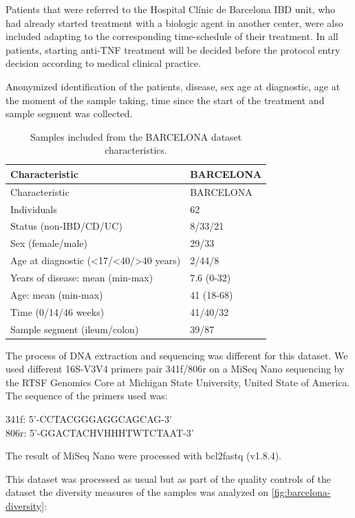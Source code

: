 \documentclass[
  a4paper,
]{book}
\begin{document}
Patients that were referred to the Hospital Clínic de Barcelona IBD unit, who had already started treatment with a biologic agent in another center, were also included adapting to the corresponding time-schedule of their treatment.
In all patients, starting anti-TNF treatment will be decided before the protocol entry decision according to medical clinical practice.

Anonymized identification of the patients, disease, sex age at diagnostic, age at the moment of the sample taking, time since the start of the treatment and sample segment was collected.

\begin{longtable}[]{@{}ll@{}}
\caption{\label{tab:BARCELONA} Samples included from the BARCELONA dataset characteristics.}\tabularnewline
\toprule
Characteristic & BARCELONA \\
\midrule
\endfirsthead
\toprule
Characteristic & BARCELONA \\
\midrule
\endhead
Individuals & 62 \\
Status (non-IBD/CD/UC) & 8/33/21 \\
Sex (female/male) & 29/33 \\
Age at diagnostic (\textless17/\textless40/\textgreater40 years) & 2/44/8 \\
Years of disease: mean (min-max) & 7.6 (0-32) \\
Age: mean (min-max) & 41 (18-68) \\
Time (0/14/46 weeks) & 41/40/32 \\
Sample segment (ileum/colon) & 39/87 \\
\bottomrule
\end{longtable}

The process of DNA extraction and sequencing was different for this dataset.
We used different 16S-V3V4 primers pair 341f/806r on a MiSeq Nano sequencing by the RTSF Genomics Core at Michigan State University, United State of America.
The sequence of the primers used was:

341f: 5'-CCTACGGGAGGCAGCAG-3'\\
806r: 5'-GGACTACHVHHHTWTCTAAT-3'

The result of MiSeq Nano were processed with bcl2fastq (v1.8.4).

This dataset was processed as usual but as part of the quality controls of the dataset the diversity measures of the samples was analyzed on \ref{fig:barcelona-diversity}:
\end{document}
